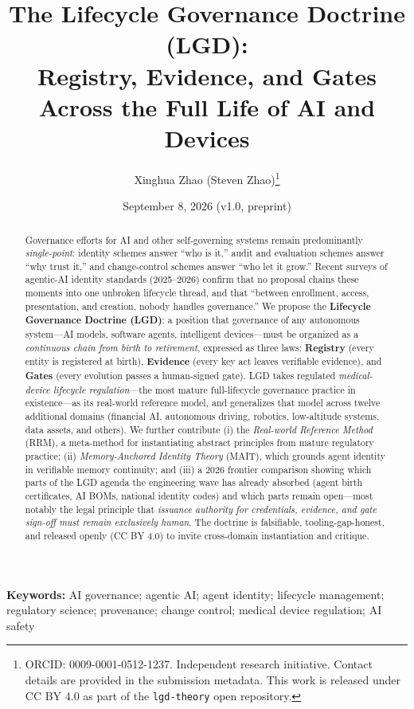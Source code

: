 \documentclass[12pt]{article}
\title{\textbf{The Lifecycle Governance Doctrine (LGD):\\ Registry, Evidence, and Gates Across the Full Life of AI and Devices}}
\author{Xinghua Zhao (Steven Zhao)\thanks{ORCID: 0009-0001-0512-1237. Independent research initiative. Contact details are provided in the submission metadata. This work is released under CC BY 4.0 as part of the \texttt{lgd-theory} open repository.}}
\date{September 8, 2026 \quad\small (v1.0, preprint)}
\begin{document}
\maketitle

\begin{abstract}
\noindent Governance efforts for AI and other self-governing systems remain predominantly \emph{single-point}: identity schemes answer ``who is it,'' audit and evaluation schemes answer ``why trust it,'' and change-control schemes answer ``who let it grow.'' Recent surveys of agentic-AI identity standards (2025--2026) confirm that no proposal chains these moments into one unbroken lifecycle thread, and that ``between enrollment, access, presentation, and creation, nobody handles governance.'' We propose the \textbf{Lifecycle Governance Doctrine (LGD)}: a position that governance of any autonomous system---AI models, software agents, intelligent devices---must be organized as a \emph{continuous chain from birth to retirement}, expressed as three laws: \textbf{Registry} (every entity is registered at birth), \textbf{Evidence} (every key act leaves verifiable evidence), and \textbf{Gates} (every evolution passes a human-signed gate). LGD takes regulated \emph{medical-device lifecycle regulation}---the most mature full-lifecycle governance practice in existence---as its real-world reference model, and generalizes that model across twelve additional domains (financial AI, autonomous driving, robotics, low-altitude systems, data assets, and others). We further contribute (i) the \emph{Real-world Reference Method} (RRM), a meta-method for instantiating abstract principles from mature regulatory practice; (ii) \emph{Memory-Anchored Identity Theory} (MAIT), which grounds agent identity in verifiable memory continuity; and (iii) a 2026 frontier comparison showing which parts of the LGD agenda the engineering wave has already absorbed (agent birth certificates, AI BOMs, national identity codes) and which parts remain open---most notably the legal principle that \emph{issuance authority for credentials, evidence, and gate sign-off must remain exclusively human}. The doctrine is falsifiable, tooling-gap-honest, and released openly (CC BY 4.0) to invite cross-domain instantiation and critique.
\end{abstract}

\vspace{0.5em}
\noindent\textbf{Keywords:} AI governance; agentic AI; agent identity; lifecycle management; regulatory science; provenance; change control; medical device regulation; AI safety
\vspace{0.5em}
\end{document}
